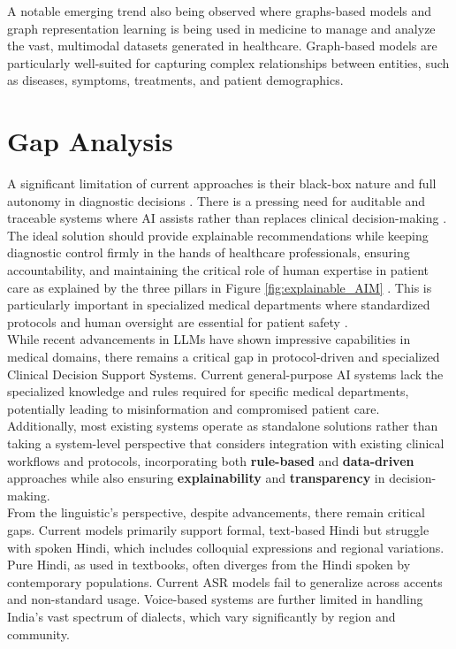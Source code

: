 \noindent A notable emerging trend also being observed where graphs-based models and graph representation learning \cite{johnson2024graph} is being used in medicine to manage and analyze the vast, multimodal datasets generated in healthcare. Graph-based models are particularly well-suited for capturing complex relationships between entities, such as diseases, symptoms, treatments, and patient demographics. 

\section{Gap Analysis}

\lettrine{A}{ } significant limitation of current approaches is their black-box nature and full autonomy in diagnostic decisions \cite{clusmann2023future}. There is a pressing need for auditable and traceable systems where AI assists rather than replaces clinical decision-making \cite{cohen2022intelligent}. The ideal solution should provide explainable recommendations while keeping diagnostic control firmly in the hands of healthcare professionals, ensuring accountability, and maintaining the critical role of human expertise in patient care as explained by the three pillars in Figure \ref{fig:explainable_AIM} \cite{explainableAIM}. This is particularly important in specialized medical departments where standardized protocols and human oversight are essential for patient safety \cite{cohen2022intelligent}.\\[\baselineskip]

\noindent While recent advancements in LLMs have shown impressive capabilities in medical domains, there remains a critical gap in protocol-driven and specialized Clinical Decision Support Systems. Current general-purpose AI systems lack the specialized knowledge and rules required for specific medical departments, potentially leading to misinformation and compromised patient care. Additionally, most existing systems operate as standalone solutions rather than taking a system-level perspective that considers integration with existing clinical workflows and protocols, incorporating both \textcolor{TUMRed}{\textbf{rule-based}} and \textcolor{TUMRed}{\textbf{data-driven}} approaches while also ensuring \textcolor{TUMRed}{\textbf{explainability}} and \textcolor{TUMRed}{\textbf{transparency}} in decision-making.\\[\baselineskip]

\noindent From the linguistic's perspective, despite advancements, there remain critical gaps. Current models primarily support formal, text-based Hindi but struggle with spoken Hindi, which includes colloquial expressions and regional variations. Pure Hindi, as used in textbooks, often diverges from the Hindi spoken by contemporary populations. Current ASR models fail to generalize across accents and non-standard usage. Voice-based systems are further limited in handling India's vast spectrum of dialects, which vary significantly by region and community.\\[\baselineskip]

